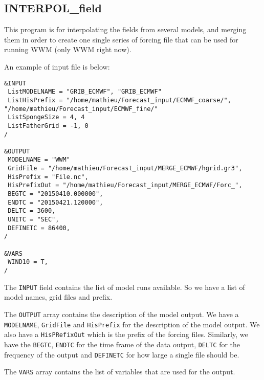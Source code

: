 \documentclass[12pt]{amsart}
\begin{document}
\subsection{INTERPOL\_field}

This program is for interpolating the fields from several models, and merging them in order to
create one single series of forcing file that can be used for running WWM (only WWM right now).

An example of input file is below:
\begin{verbatim}
&INPUT
 ListMODELNAME = "GRIB_ECMWF", "GRIB_ECMWF"
 ListHisPrefix = "/home/mathieu/Forecast_input/ECMWF_coarse/", "/home/mathieu/Forecast_input/ECMWF_fine/"
 ListSpongeSize = 4, 4
 ListFatherGrid = -1, 0
/

&OUTPUT
 MODELNAME = "WWM"
 GridFile = "/home/mathieu/Forecast_input/MERGE_ECMWF/hgrid.gr3",
 HisPrefix = "File.nc",
 HisPrefixOut = "/home/mathieu/Forecast_input/MERGE_ECMWF/Forc_",
 BEGTC = "20150410.000000",
 ENDTC = "20150421.120000",
 DELTC = 3600, 
 UNITC = "SEC", 
 DEFINETC = 86400,
/

&VARS
 WIND10 = T, 
/
\end{verbatim}
The {\tt INPUT} field contains the list of model runs available. So we have a list of model names, grid files and prefix.

The {\tt OUTPUT} array contains the description of the model output. We have a {\tt MODELNAME}, {\tt GridFile} and {\tt HisPrefix} for the description of the model output. We also have a {\tt HisPRefixOut} which is the prefix of the forcing files.
Similarly, we have the {\tt BEGTC}, {\tt ENDTC} for the time frame of the data output, {\tt DELTC} for the frequency of the output and {\tt DEFINETC} for how large a single file should be.

The {\tt VARS} array contains the list of variables that are used for the output.
\end{document}
